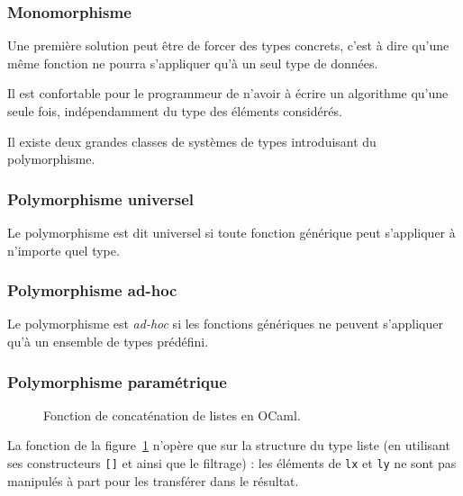 \subsubsection{Monomorphisme}

Une première solution peut être de forcer des types concrets, c'est à dire
qu'une même fonction ne pourra s'appliquer qu'à un seul type de données.

Il est confortable pour le programmeur de n'avoir à écrire un algorithme qu'une
seule fois, indépendamment du type des éléments considérés.

Il existe deux grandes classes de systèmes de types introduisant du
polymorphisme.

\subsubsection{Polymorphisme universel}


Le polymorphisme est dit universel si toute fonction générique peut s'appliquer
à n'importe quel type.

\subsubsection{Polymorphisme ad-hoc}


Le polymorphisme est \emph{ad-hoc} si les fonctions génériques ne peuvent
s'appliquer qu'à un ensemble de types prédéfini.

\subsubsection{Polymorphisme paramétrique}

\cite{Milner78}

\cite{PascalNoEscape}

\begin{figure}
  \caption{Fonction de concaténation de listes en OCaml.}
  \label{fig:listappend}
\end{figure}

La fonction de la figure~\ref{fig:listappend} n'opère que sur la structure du type
liste (en utilisant ses constructeurs \texttt{{[}{]}} et \listcons ainsi que
le filtrage) : les éléments de \texttt{lx} et \texttt{ly} ne sont pas manipulés
à part pour les transférer dans le résultat.

